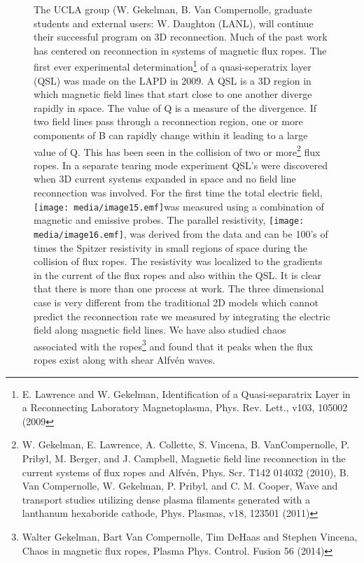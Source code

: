 \documentclass[11pt]{article}
\begin{document}
\begin{description}
\begin{figure}[!htbp]
The UCLA group (W. Gekelman, B. Van Compernolle, graduate students and
external users: W. Daughton (LANL), will continue their successful
program on 3D reconnection. Much of the past work has centered on
reconnection in systems of magnetic flux ropes. The first ever
experimental determination\footnote{E. Lawrence and W. Gekelman,
  Identification of a Quasi-separatrix Layer in a Reconnecting
  Laboratory Magnetoplasma, Phys. Rev. Lett., v103, 105002 (2009} of a
quasi-seperatrix layer (QSL) was made on the LAPD in 2009. A QSL is a 3D
region in which magnetic field lines that start close to one another
diverge rapidly in space. The value of Q is a measure of the divergence.
If two field lines pass through a reconnection region, one or more
components of B can rapidly change within it leading to a large value of
Q. This has been seen in the collision of two or more\footnote{W.
  Gekelman, E. Lawrence, A. Collette, S. Vincena, B. VanCompernolle, P.
  Pribyl, M. Berger, and J. Campbell, Magnetic field line reconnection
  in the current systems of flux ropes and Alfvén, Phys. Scr. T142
  014032 (2010), B. Van Compernolle, W. Gekelman, P. Pribyl, and C. M.
  Cooper, Wave and transport studies utilizing dense plasma filaments
  generated with a lanthanum hexaboride cathode, Phys. Plasmas, v18,
  123501 (2011)} flux ropes. In a separate tearing mode experiment QSL's
were discovered when 3D current systems expanded in space and no field
line reconnection was involved. For the first time the total electric
field, \texttt{[image: media/image15.emf]}was measured using a
combination of magnetic and emissive probes. The parallel resistivity,
\texttt{[image: media/image16.emf]}, was derived from the data and can
be 100's of times the Spitzer resistivity in small regions of space
during the collision of flux ropes. The resistivity was localized to the
gradients in the current of the flux ropes and also within the QSL. It
is clear that there is more than one process at work. The three
dimensional case is very different from the traditional 2D models which
cannot predict the reconnection rate we measured by integrating the
electric field along magnetic field lines. We have also studied chaos
associated with the ropes\footnote{Walter Gekelman, Bart Van
  Compernolle, Tim DeHaas and Stephen Vincena, Chaos in magnetic flux
  ropes, Plasma Phys. Control. Fusion 56 (2014)} and found that it peaks
when the flux ropes exist along with shear Alfvén waves.


\end{figure}
\end{description}
\end{document}
